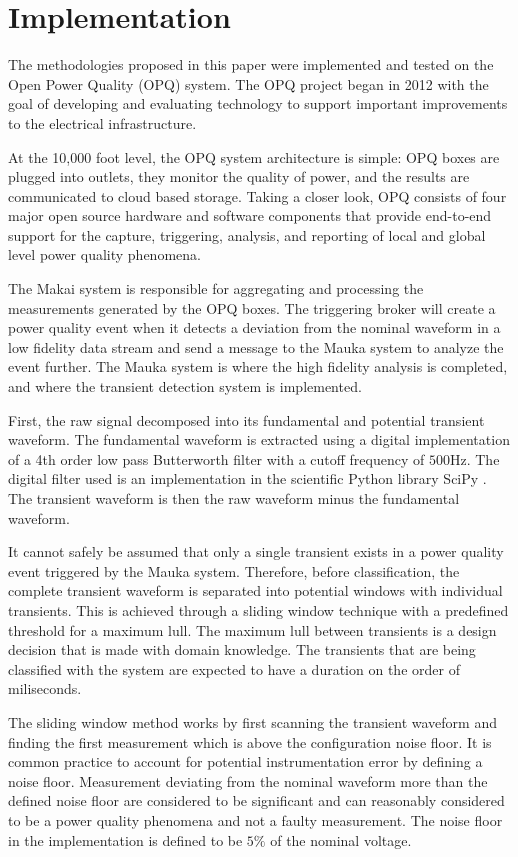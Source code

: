 \documentclass[10pt,conference,compsocconf]{IEEEtran}
\begin{document}
\section{Implementation}
\label{sec:Implementation}
The methodologies proposed in this paper were implemented and tested on the Open Power Quality (OPQ) system. The OPQ project began in 2012 with the goal of developing and evaluating technology to support important improvements to the electrical infrastructure. 

At the 10,000 foot level, the OPQ system architecture is simple: OPQ boxes are plugged into outlets, they monitor the quality of power, and the results are communicated to cloud based storage. Taking a closer look, OPQ consists of four major open source hardware and software components that provide end-to-end support for the capture, triggering, analysis, and reporting of local and global level power quality phenomena. 

The Makai system is responsible for aggregating and processing the measurements generated by the OPQ boxes. The triggering broker will create a power quality event when it detects a deviation from the nominal waveform in a low fidelity data stream and send a message to the Mauka system to analyze the event further. The Mauka system is where the high fidelity analysis is completed, and where the transient detection system is implemented.

First, the raw signal decomposed into its fundamental and potential transient waveform. The fundamental waveform is extracted using a digital implementation of a 4th order low pass Butterworth filter with a cutoff frequency of $500$Hz. The digital filter used is an implementation in the scientific Python library SciPy \cite{scipy:2019}. The transient waveform is then the raw waveform minus the fundamental waveform.

It cannot safely be assumed that only a single transient exists in a power quality event triggered by the Mauka system. Therefore, before classification, the complete transient waveform is separated into potential windows with individual transients. This is achieved through a sliding window technique with a predefined threshold for a maximum lull. The maximum lull between transients is a design decision that is made with domain knowledge. The transients that are being classified with the system are expected to have a duration on the order of miliseconds. 

The sliding window method works by first scanning the transient waveform and finding the first measurement which is above the configuration noise floor. It is common practice to account for potential instrumentation error by defining a noise floor. Measurement deviating from the nominal waveform more than the defined noise floor are considered to be significant and can reasonably considered to be a power quality phenomena and not a faulty measurement. The noise floor in the implementation is defined to be $5\%$ of the nominal voltage. 
\end{document}
